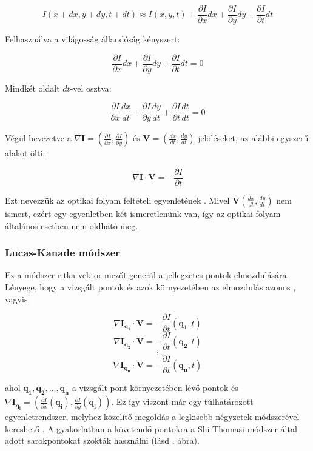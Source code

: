 \[I(x+dx, y+dy, t+dt) \approx I(x, y, t) + \frac{\partial I}{\partial x} dx + \frac{\partial I}{\partial y} dy + \frac{\partial I}{\partial t} dt\]

Felhasználva a világosság állandóság kényszert:

\[\frac{\partial I}{\partial x} dx + \frac{\partial I}{\partial y} dy + \frac{\partial I}{\partial t} dt = 0\]

Mindkét oldalt $dt$-vel osztva:

\[\frac{\partial I}{\partial x} \frac{dx}{dt} + \frac{\partial I}{\partial y} \frac{dy}{dt} + \frac{\partial I}{\partial t} \frac{dt}{dt} = 0\]

Végül bevezetve a $\nabla \mathbf{I} = \left(\frac{\partial I}{\partial x}, \frac{\partial I}{\partial y}\right)$ és $\mathbf{V} = \left(\frac{dx}{dt}, \frac{dy}{dt}\right)$ jelöléseket, az alábbi egyszerű alakot ölti:

\[\nabla \mathbf{I} \cdot \mathbf{V} = -\frac{\partial I}{\partial t}\]

Ezt nevezzük az optikai folyam feltételi egyenletének \cite{phd}. Mivel $\mathbf{V}\left(\frac{dx}{dt}, \frac{dy}{dt}\right)$ nem ismert, ezért egy egyenletben két ismeretlenünk van, így az optikai folyam általános esetben nem oldható meg.

\subsubsection{Lucas-Kanade módszer \cite{LK}}

Ez a módszer ritka vektor-mezőt generál a jellegzetes pontok elmozdulására. Lényege, hogy a vizsgált pontok és azok környezetében az elmozdulás azonos \cite{lk-wiki}, vagyis:

\[\nabla \mathbf{I}_{\mathbf{q_1}} \cdot \mathbf{V} = -\frac{\partial I}{\partial t}(\mathbf{q_1}, t)\]
\[\nabla \mathbf{I}_{\mathbf{q_2}} \cdot \mathbf{V} = -\frac{\partial I}{\partial t}(\mathbf{q_2}, t)\]
\[\vdots\]
\[\nabla \mathbf{I}_{\mathbf{q_n}} \cdot \mathbf{V} = -\frac{\partial I}{\partial t}(\mathbf{q_n}, t)\]

ahol $\mathbf{q_1},\mathbf{q_2},\ldots,\mathbf{q_n}$ a vizsgált pont környezetében lévő pontok és $\nabla \mathbf{I}_{\mathbf{q_i}} = \left(\frac{\partial I}{\partial x}(\mathbf{q_i}), \frac{\partial I}{\partial y}(\mathbf{q_i})\right)$. Ez így viszont már egy túlhatározott egyenletrendszer, melyhez közelítő megoldás a legkisebb-négyzetek módszerével kereshető \cite{LK, lk-wiki}. A gyakorlatban a követendő pontokra a Shi-Thomasi \cite{shi-thomasi} módszer által adott sarokpontokat szokták használni (lásd . ábra).

